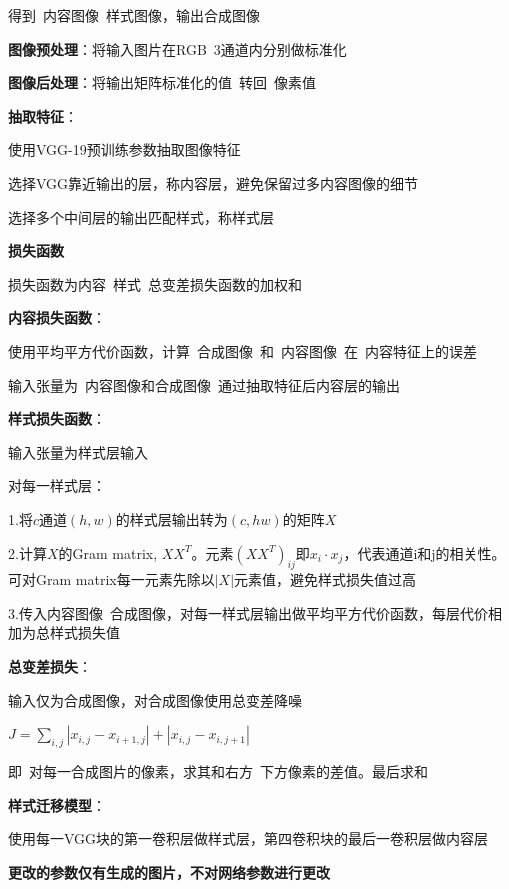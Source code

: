\documentclass[UTF8]{ctexart}
\begin{document}
  得到\ 内容图像\ 样式图像，输出合成图像

  \textbf{图像预处理}：将输入图片在RGB\ 3通道内分别做标准化

  \textbf{图像后处理}：将输出矩阵标准化的值\ 转回\ 像素值

  \textbf{抽取特征}：

  \quad 使用VGG-19预训练参数抽取图像特征

  \quad \quad 选择VGG靠近输出的层，称内容层，避免保留过多内容图像的细节

  \quad \quad 选择多个中间层的输出匹配样式，称样式层

  \textbf{损失函数}

  \quad 损失函数为内容\ 样式\ 总变差损失函数的加权和

  \quad \textbf{内容损失函数}：

  \quad \quad 使用平均平方代价函数，计算\ 合成图像\ 和\ 内容图像\ 在\ 内容特征上的误差

  \quad \quad 输入张量为\ 内容图像和合成图像\ 通过抽取特征后内容层的输出

  \quad \textbf{样式损失函数}：

  \quad \quad 输入张量为样式层输入

  \quad \quad 对每一样式层：

  \quad \quad \quad 1.将$c$通道$(h, w)$的样式层输出转为$(c, hw)$的矩阵$X$

  \quad \quad \quad 2.计算$X$的Gram matrix, $XX^T$。元素$(XX^T)_{ij}$即$x_i \cdot x_j$，代表通道i和j的相关性。可对Gram matrix每一元素先除以$|X|$元素值，避免样式损失值过高

  \quad \quad \quad 3.传入内容图像\ 合成图像，对每一样式层输出做平均平方代价函数，每层代价相加为总样式损失值

  \quad \textbf{总变差损失}：

  \quad \quad 输入仅为合成图像，对合成图像使用总变差降噪

  \quad \quad $J = \sum_{i, j} |x_{i,j} - x_{i+1,j}| + |x_{i,j} - x_{i,j+1}|$

  \quad \quad \quad 即\ 对每一合成图片的像素，求其和右方\ 下方像素的差值。最后求和

  \textbf{样式迁移模型}：

  \quad 使用每一VGG块的第一卷积层做样式层，第四卷积块的最后一卷积层做内容层
  
  \quad \textbf{更改的参数仅有生成的图片，不对网络参数进行更改}

\end{document}
